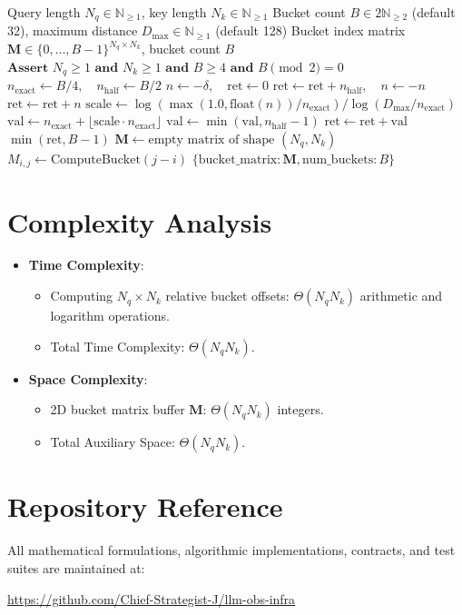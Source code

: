 \documentclass[11pt,a4paper]{article}
\theoremstyle{definition}
\begin{document}
\begin{algorithm}[H]
\caption{T5 Relative Position Bias Matrix Evaluation}
\label{alg:rel_pos_bias}
\begin{algorithmic}[1]
\Require Query length $N_q \in \mathbb{N}_{\ge 1}$, key length $N_k \in \mathbb{N}_{\ge 1}$
\Require Bucket count $B \in 2\mathbb{N}_{\ge 2}$ (default 32), maximum distance $D_{\text{max}} \in \mathbb{N}_{\ge 1}$ (default 128)
\Ensure Bucket index matrix $\mathbf{M} \in \{0, \dots, B-1\}^{N_q \times N_k}$, bucket count $B$
\State $\textbf{Assert } N_q \ge 1 \textbf{ and } N_k \ge 1 \textbf{ and } B \ge 4 \textbf{ and } B \pmod 2 = 0$
\State $n_{\text{exact}} \gets B / 4, \quad n_{\text{half}} \gets B / 2$
    \State $n \gets -\delta, \quad \text{ret} \gets 0$
        \State $\text{ret} \gets \text{ret} + n_{\text{half}}, \quad n \gets -n$
    \EndIf
        \State $\text{ret} \gets \text{ret} + n$
    \Else
        \State $\text{scale} \gets \log(\max(1.0, \text{float}(n)) / n_{\text{exact}}) / \log(D_{\text{max}} / n_{\text{exact}})$
        \State $\text{val} \gets n_{\text{exact}} + \lfloor \text{scale} \cdot n_{\text{exact}} \rfloor$
        \State $\text{val} \gets \min(\text{val}, n_{\text{half}} - 1)$
        \State $\text{ret} \gets \text{ret} + \text{val}$
    \EndIf
    \State \Return $\min(\text{ret}, B - 1)$
\EndFunction
\State $\mathbf{M} \gets \text{empty matrix of shape } (N_q, N_k)$
        \State $M_{i, j} \gets \text{ComputeBucket}(j - i)$
    \EndFor
\EndFor
\State \Return $\{\text{bucket\_matrix}: \mathbf{M}, \text{num\_buckets}: B\}$
\end{algorithmic}
\end{algorithm}

\section{Complexity Analysis}
\begin{itemize}
    \item \textbf{Time Complexity}:
    \begin{itemize}
        \item Computing $N_q \times N_k$ relative bucket offsets: $\Theta(N_q N_k)$ arithmetic and logarithm operations.
        \item Total Time Complexity: $\Theta(N_q N_k)$.
    \end{itemize}
    \item \textbf{Space Complexity}:
    \begin{itemize}
        \item 2D bucket matrix buffer $\mathbf{M}$: $\Theta(N_q N_k)$ integers.
        \item Total Auxiliary Space: $\Theta(N_q N_k)$.
    \end{itemize}
\end{itemize}

\section{Repository Reference}
All mathematical formulations, algorithmic implementations, contracts, and test suites are maintained at:
\begin{center}
\url{https://github.com/Chief-Strategist-J/llm-obs-infra}
\end{center}
\end{document}
